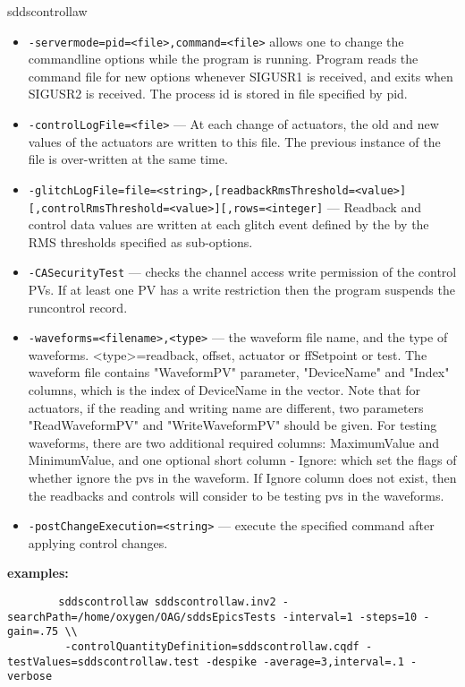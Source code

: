 \begin{sddsprog}{sddscontrollaw}
\begin{itemize}
  \item {\tt -servermode=pid=<file>,command=<file>}     allows one to change the commandline options while the program is
               running. Program reads the command file for new options whenever
               SIGUSR1 is received, and exits when SIGUSR2 is received.
               The process id is stored in file specified by pid.
  \item {\tt -controlLogFile=<file>} --- At each change of actuators, the old and new values of the actuators
               are written to this file. The previous instance of the file
               is over-written at the same time.
  \item {\tt -glitchLogFile=file=<string>,[readbackRmsThreshold=<value>][,controlRmsThreshold=<value>][,rows=<integer]} ---
                  Readback and control data values
               are written at each glitch event defined by the
               by the RMS thresholds specified as sub-options.
  \item {\tt -CASecurityTest} --- checks the channel access write permission of the control PVs.
               If at least one PV has a write restriction then the program suspends
               the runcontrol record.
  \item {\tt -waveforms=<filename>,<type>} --- the waveform file name, and the type of
               waveforms. <type>=readback, offset, actuator or ffSetpoint or test.
               The waveform file contains "WaveformPV" parameter,
               "DeviceName" and "Index" columns, which is the index of DeviceName in
               the vector. Note that for actuators, if the reading and writing name are
               different, two parameters "ReadWaveformPV" and "WriteWaveformPV"
               should be given. For testing waveforms, there are two additional required columns:
               MaximumValue and MinimumValue, and one optional short column - Ignore:
               which set the flags of whether ignore the pvs in the waveform. If Ignore column
               does not exist, then the readbacks and controls will consider to be testing pvs
               in the waveforms.
  \item {\tt -postChangeExecution=<string>} --- execute the specified command after applying control changes.
\end{itemize}

\item \textbf{examples:}
     \begin{verbatim}
        sddscontrollaw sddscontrollaw.inv2 -searchPath=/home/oxygen/OAG/sddsEpicsTests -interval=1 -steps=10 -gain=.75 \\
         -controlQuantityDefinition=sddscontrollaw.cqdf -testValues=sddscontrollaw.test -despike -average=3,interval=.1 -verbose
     

\end{verbatim}
\end{sddsprog}
